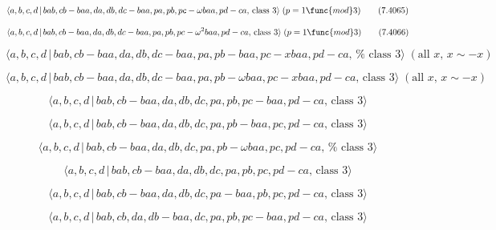 \documentclass[10pt]{article}
\begin{document}
\begin{equation}
\langle a,b,c,d\,|\,bab,cb-baa,da,db,dc-baa,pa,pb,pc-\omega baa,pd-ca,\,%
\text{class }3\rangle \;(p=1\func{mod}3)  \tag{7.4065}
\end{equation}

\begin{equation}
\langle a,b,c,d\,|\,bab,cb-baa,da,db,dc-baa,pa,pb,pc-\omega ^{2}baa,pd-ca,\,%
\text{class }3\rangle \;(p=1\func{mod}3)  \tag{7.4066}
\end{equation}

\begin{equation}
\langle a,b,c,d\,|\,bab,cb-baa,da,db,dc-baa,pa,pb-baa,pc-xbaa,pd-ca,\,\text{%
class }3\rangle \;(\text{all }x,\,x\sim -x)  \tag{7.4067}
\end{equation}

\begin{equation}
\langle a,b,c,d\,|\,bab,cb-baa,da,db,dc-baa,pa,pb-\omega baa,pc-xbaa,pd-ca,\,%
\text{class }3\rangle \;(\text{all }x,\,x\sim -x)  \tag{7.4068}
\end{equation}

\begin{equation}
\langle a,b,c,d\,|\,bab,cb-baa,da,db,dc,pa,pb,pc-baa,pd-ca,\,\text{class }%
3\rangle  \tag{7.4069}
\end{equation}

\begin{equation}
\langle a,b,c,d\,|\,bab,cb-baa,da,db,dc,pa,pb-baa,pc,pd-ca,\,\text{class }%
3\rangle  \tag{7.4070}
\end{equation}

\begin{equation}
\langle a,b,c,d\,|\,bab,cb-baa,da,db,dc,pa,pb-\omega baa,pc,pd-ca,\,\text{%
class }3\rangle  \tag{7.4071}
\end{equation}

\begin{equation}
\langle a,b,c,d\,|\,bab,cb-baa,da,db,dc,pa,pb,pc,pd-ca,\,\text{class }%
3\rangle  \tag{7.4072}
\end{equation}

\begin{equation}
\langle a,b,c,d\,|\,bab,cb-baa,da,db,dc,pa-baa,pb,pc,pd-ca,\,\text{class }%
3\rangle  \tag{7.4073}
\end{equation}

\begin{equation}
\langle a,b,c,d\,|\,bab,cb,da,db-baa,dc,pa,pb,pc-baa,pd-ca,\,\text{class }%
3\rangle  \tag{7.4074}
\end{equation}
\end{document}
